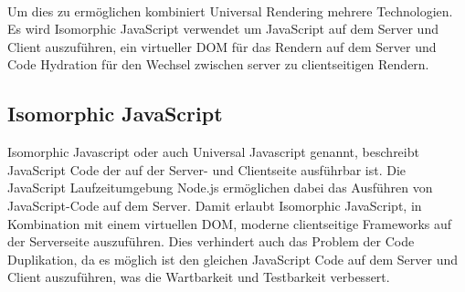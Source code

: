 \documentclass[runningheads]{llncs}
\numberwithin{figure}{section}
\begin{document}
\\
Um dies zu ermöglichen kombiniert Universal Rendering mehrere Technologien. 
Es wird Isomorphic JavaScript verwendet um JavaScript auf dem Server und Client auszuführen, 
ein virtueller DOM für das Rendern auf dem Server und 
Code Hydration für den Wechsel zwischen server zu clientseitigen Rendern. \cite{tarkus_alabes}

\subsection{Isomorphic JavaScript}
\label{subsec:Isomorphic JavaScript}
Isomorphic Javascript oder auch Universal Javascript genannt, 
beschreibt JavaScript Code der auf der Server- und Clientseite ausführbar ist. 
Die JavaScript Laufzeitumgebung Node.js ermöglichen dabei 
das Ausführen von JavaScript-Code auf dem Server. 
Damit erlaubt Isomorphic JavaScript, 
in Kombination mit einem virtuellen DOM, moderne clientseitige Frameworks auf der Serverseite auszuführen. 
Dies verhindert auch das Problem der Code Duplikation, 
da es möglich ist den gleichen JavaScript Code auf dem Server und Client auszuführen, 
was die Wartbarkeit und Testbarkeit verbessert. \cite{airbnbeng_2013}
\end{document}
